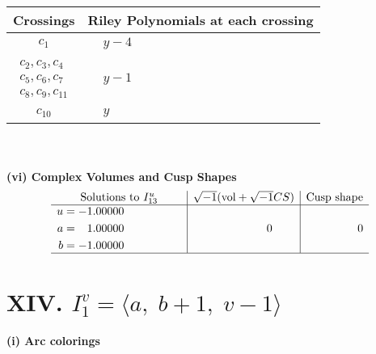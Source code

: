 \documentclass[1p]{elsarticle_modified}
\theoremstyle{definition}
\newcommand{\I}{\sqrt{-1}}
\begin{document}
\begin{tabular}{m{50pt}|m{274pt}}
Crossings & \hspace{64pt}Riley Polynomials at each crossing \\
\hline $$\begin{aligned}c_{1}\end{aligned}$$&$\begin{aligned}
&y-4
\end{aligned}$\\
\hline $$\begin{aligned}c_{2},c_{3},c_{4}\\c_{5},c_{6},c_{7}\\c_{8},c_{9},c_{11}\end{aligned}$$&$\begin{aligned}
&y-1
\end{aligned}$\\
\hline $$\begin{aligned}c_{10}\end{aligned}$$&$\begin{aligned}
&y
\end{aligned}$\\
\hline
\end{tabular}\\~\\
\newpage\flushleft \textbf{(vi) Complex Volumes and Cusp Shapes}
$$\begin{array}{c|c|c}  
\text{Solutions to }I^u_{13}& \I (\text{vol} + \sqrt{-1}CS) & \text{Cusp shape}\\
 \hline 
\begin{aligned}
u &= -1.00000\phantom{ +0.000000I} \\
a &= \phantom{-}1.00000\phantom{ +0.000000I} \\
b &= -1.00000\phantom{ +0.000000I}\end{aligned}
 & \phantom{-0.000000 } 0 & \phantom{-0.000000 } 0\\
 \hline 
 \end{array}$$\newpage\newpage\renewcommand{\arraystretch}{1}
\centering \section*{XIV. $I^v_{1}= \langle a,\;b+1,\;v-1 \rangle$}
\flushleft \textbf{(i) Arc colorings}\\
\end{document}
